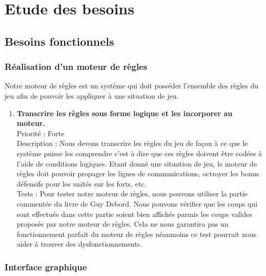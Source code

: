 \chapter{Etude des besoins}

	\section{Besoins fonctionnels}

		\subsection{Réalisation d'un moteur de règles}

			Notre moteur de règles est un système qui doit posséder l'ensemble des règles du jeu afin de pouvoir les appliquer à une situation de jeu.

			\begin{enumerate}

				\item \textbf{Transcrire les règles sous forme logique et les incorporer au moteur.} 
				\\[0.7\baselineskip]
				Priorité : Forte 
				\\[0.7\baselineskip]
				Description : Nous devons transcrire les règles du jeu de façon à ce que le système puisse les comprendre c'est à dire que ces 
				règles doivent être codées à l'aide de conditions logiques. Etant donné une situation de jeu, le moteur de règles doit pouvoir 
				propager les lignes de communications, octroyer les bonus défensifs pour les unités sur les forts, etc.
				\\[0.7\baselineskip]
				Tests : Pour tester notre moteur de règles, nous pouvons utiliser la partie commentée du livre de Guy Debord. Nous pouvons 
				vérifier que les coups qui sont effectués dans cette partie soient bien affichés parmis les coups valides proposés par notre 
				moteur de règles. Cela ne nous garantira pas un fonctionnement parfait du moteur de règles néanmoins ce test pourrait nous 
				aider à trouver des dysfonctionnements. 
				\\[0.7\baselineskip]
				
			\end{enumerate}

		\subsection{Interface graphique}

